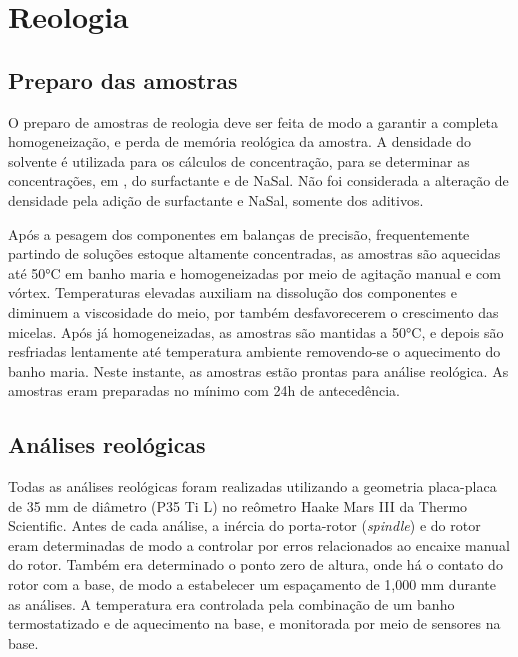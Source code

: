 	
	
	\chapter{Reologia}
		\section{Preparo das amostras}
		\label{sec:reologia_preparo_amostra}
		O preparo de amostras de reologia deve ser feita de modo a garantir a completa homogeneização, e perda de memória reológica da amostra. A densidade do solvente é utilizada para os cálculos de concentração, para se determinar as concentrações, em \mM, do surfactante e de NaSal. Não foi considerada a alteração de densidade pela adição de surfactante e NaSal, somente dos aditivos.
		
		Após a pesagem dos componentes em balanças de precisão, frequentemente partindo de soluções estoque altamente concentradas, as amostras são aquecidas até 50°C em banho maria e homogeneizadas por meio de agitação manual e com vórtex. Temperaturas elevadas auxiliam na dissolução dos componentes e diminuem a viscosidade do meio, por também desfavorecerem o crescimento das micelas. Após já homogeneizadas, as amostras são mantidas a 50°C, e depois são resfriadas lentamente até temperatura ambiente removendo-se o aquecimento do banho maria. Neste instante, as amostras estão prontas para análise reológica. As amostras eram preparadas no mínimo com 24h de antecedência.
		
		\section{Análises reológicas}

		Todas as análises reológicas foram realizadas utilizando a geometria placa-placa de 35 mm de diâmetro (P35 Ti L) no reômetro Haake Mars III da Thermo Scientific. Antes de cada análise, a inércia do porta-rotor (\emph{spindle}) e do rotor eram determinadas de modo a controlar por erros relacionados ao encaixe manual do rotor. Também era determinado o ponto zero de altura, onde há o contato do rotor com a base, de modo a estabelecer um espaçamento de 1,000 mm durante as análises. A temperatura era controlada pela combinação de um banho termostatizado e de aquecimento na base, e monitorada por meio de sensores na base.
		
